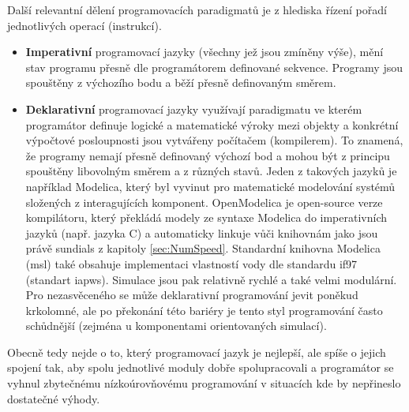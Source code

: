 Další relevantní dělení programovacích paradigmatů je z hlediska řízení pořadí
jednotlivých operací (instrukcí).
\begin{itemize}
\item
\textbf{Imperativní} programovací jazyky (všechny jež jsou zmíněny výše), mění
stav programu přesně dle programátorem definované sekvence. Programy jsou
spouštěny z výchozího bodu a běží přesně definovaným směrem.
\item
\textbf{Deklarativní} programovací jazyky využívají paradigmatu ve kterém
programátor definuje logické a matematické výroky mezi objekty a konkrétní
výpočtové posloupnosti jsou vytvářeny počítačem (kompilerem). To znamená, že
programy nemají přesně definovaný výchozí bod a mohou být z principu spouštěny
libovolným směrem a z různých stavů. Jeden z takových jazyků je například
Modelica, který byl vyvinut pro matematické modelování systémů složených z
interagujících komponent. OpenModelica \cite{Fritzson2019} je open-source verze
kompilátoru, který překládá modely ze syntaxe Modelica do imperativních jazyků
(např. jazyka C) a automaticky linkuje vůči knihovnám jako jsou právě
\acrshort{sundials} z kapitoly \ref{sec:NumSpeed}. Standardní knihovna Modelica
(\acrshort{msl}) také obsahuje implementaci vlastností vody dle standardu
\acrshort{if97} (standart \acrshort{iapws}). Simulace jsou pak relativně rychlé
a také velmi modulární. Pro nezasvěceného se může deklarativní programování
jevit poněkud krkolomné, ale po překonání této bariéry je tento styl
programování často schůdnější (zejména u komponentami orientovaných simulací).
\end{itemize}
Obecně tedy nejde o to, který programovací jazyk je nejlepší, ale spíše o
jejich spojení tak, aby spolu jednotlivé moduly dobře spolupracovali a
programátor se vyhnul zbytečnému nízkoúrovňovému programování v situacích kde
by nepřineslo dostatečné výhody.

